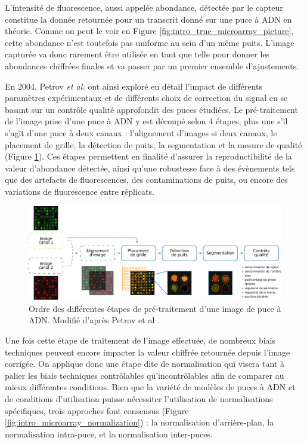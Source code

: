 L'intensité de fluorescence, aussi appelée abondance, détectée par le capteur constitue la donnée retournée pour un transcrit donné sur une puce à \acrshort{ADN} en théorie. Comme on peut le voir en Figure \ref{fig:intro_true_microarray_picture}, cette abondance n'est toutefois pas uniforme au sein d'un même puits. L'image capturée va donc rarement être utilisée en tant que telle pour donner les abondances chiffrées finales et va passer par un premier ensemble d'ajustements.

En 2004, Petrov \textit{et al.} \cite{Petrov2004Nov} ont ainsi exploré en détail l'impact de différents paramètres expérimentaux et de différents choix de correction du signal en se basant sur un contrôle qualité approfondit des puces étudiées. Le pré-traitement de l'image prise d'une puce à \acrshort{ADN} y est découpé selon 4 étapes, plus une s'il s'agît d'une puce à deux canaux : l'alignement d'images si deux canaux, le placement de grille, la détection de puits, la segmentation et la mesure de qualité (Figure \ref{fig:intro_microarray_image_preprocessing}). Ces étapes permettent en finalité d'assurer la reproductibilité de la valeur d'abondance détectée, ainsi qu'une robustesse face à des évènements tels que des artefacts de fluorescences, des contaminations de puits, ou encore des variations de fluorescence entre réplicats.

\begin{figure}[b]
    \centering
    \includegraphics[width=\textwidth]{img/intro/2_meth_transcripto/intro_2_microarray_image_preprocessing.pdf}
    \caption[Ordre des différentes étapes de pré-traitement d'une image de puce à ADN]{Ordre des différentes étapes de pré-traitement d'une image de puce à ADN. Modifié d'après Petrov et al \cite{Petrov2004Nov}.}
    \label{fig:intro_microarray_image_preprocessing}
\end{figure}

Une fois cette étape de traitement de l'image effectuée, de nombreux biais techniques peuvent encore impacter la valeur chiffrée retournée depuis l'image corrigée. On applique donc une étape dite de normalisation qui visera tant à palier les biais techniques contrôlables qu'incontrôlables afin de comparer au mieux différentes conditions. Bien que la variété de modèles de puces à \acrshort{ADN} et de conditions d'utilisation puisse nécessiter l'utilisation de normalisations spécifiques, trois approches font consensus \cite{Smyth2003Dec} (Figure \ref{fig:intro_microarray_normalization}) : la normalisation d'arrière-plan, la normalisation intra-puce, et la normalisation inter-puces.

